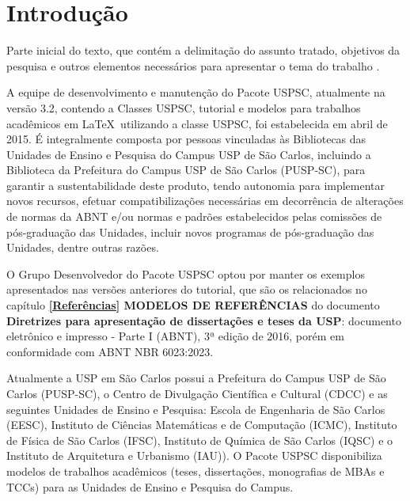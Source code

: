 
\chapter[Introdução]{Introdução}
\label{Introdução}

Parte inicial do texto, que contém a delimitação do assunto tratado, objetivos da pesquisa e outros elementos necessários para apresentar o tema do trabalho \cite{aguia2020}.

A equipe de desenvolvimento e manutenção do Pacote USPSC, atualmente na versão 3.2, contendo a Classes USPSC, tutorial e modelos para trabalhos acadêmicos em \LaTeX\ utilizando a classe USPSC, foi estabelecida em abril de 2015. É integralmente composta por pessoas vinculadas às Bibliotecas das Unidades de Ensino e Pesquisa do Campus USP de São Carlos, incluindo a Biblioteca da Prefeitura do Campus USP de São Carlos (PUSP-SC), para garantir a sustentabilidade deste produto, tendo autonomia para implementar novos recursos, efetuar compatibilizações necessárias em decorrência de alterações de normas da ABNT e/ou normas e padrões estabelecidos pelas comissões de pós-graduação das Unidades, incluir novos programas de pós-graduação das Unidades, dentre outras razões.

O Grupo Desenvolvedor do Pacote USPSC optou por manter os exemplos apresentados nas versões anteriores do tutorial, que são os relacionados no capítulo \textbf{\ref{Referências} MODELOS DE REFERÊNCIAS} do documento \textbf{Diretrizes para apresentação de dissertações e teses da USP}: documento eletrônico e impresso - Parte I (ABNT), 3ª edição de 2016, porém em conformidade com ABNT NBR 6023:2023.

Atualmente a USP em São Carlos possui a Prefeitura do Campus USP de São Carlos (PUSP-SC), o Centro de Divulgação Científica e Cultural (CDCC) e as seguintes Unidades de Ensino e Pesquisa: Escola de Engenharia de São Carlos (EESC), Instituto de Ciências Matemáticas e de Computação (ICMC), Instituto de Física de São Carlos (IFSC), Instituto de Química de São Carlos (IQSC) e o Instituto de Arquitetura e Urbanismo (IAU)). O Pacote USPSC disponibiliza modelos de trabalhos acadêmicos (teses, dissertações, monografias de MBAs e TCCs) para as Unidades de Ensino e Pesquisa do Campus.

